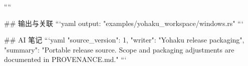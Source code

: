````

## 输出与关联
```yaml
output: "examples/yohaku_workspace/windows.rs"
```

## AI 笔记
```yaml
{"source_version": 1, "writer": "Yohaku release packaging", "summary": "Portable release source. Scope and packaging adjustments are documented in PROVENANCE.md."}
```
